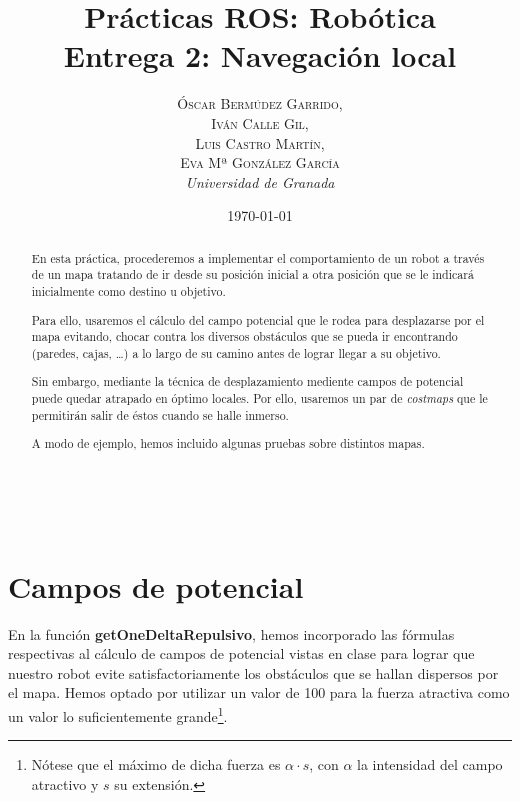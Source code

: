 \documentclass[a4paper, 11pt]{article}
\title{\textbf{Prácticas ROS: Robótica}\\ %
Entrega 2: Navegación local} %
\author{\textsc{Óscar Bermúdez Garrido,\\Iván Calle Gil,\\ Luis Castro Martín,\\ Eva Mª González García} %
\\{\textit{Universidad de Granada}}} %
\date{\today} %
\makeatletter
\renewcommand{\maketitle}{
  \begin{flushright} %
  
  {\LARGE\@title} %
  
  \vspace{50pt} %
  
  {\large\@author} %
  \\\@date %
  \vspace{40pt} %
  \end{flushright}
}
\makeatother
\begin{document}
\maketitle %

\renewcommand{\abstractname}{Resumen} %
\begin{abstract}
	En esta práctica, procederemos a implementar el comportamiento de un robot a través de un mapa
	tratando de ir desde su posición inicial a otra posición que se le indicará inicialmente como
	destino u objetivo.
	
	Para ello, usaremos el cálculo del campo potencial que le rodea para desplazarse por el mapa evitando,
	chocar contra los diversos obstáculos que se pueda ir encontrando (paredes, cajas, \dots) a lo largo
	de su camino antes de lograr llegar a su objetivo.

	Sin embargo, mediante la técnica de desplazamiento mediente campos de potencial puede quedar atrapado
	en óptimo locales. Por ello, usaremos un par de \textit{costmaps} que le permitirán salir de éstos
	cuando se halle inmerso.
	
	A modo de ejemplo, hemos incluido algunas pruebas sobre distintos mapas.
	
	
\end{abstract}


{\parskip=2pt
  \tableofcontents
}
\pagebreak


\section{Campos de potencial}
	En la función \textbf{getOneDeltaRepulsivo}, hemos incorporado las fórmulas respectivas al cálculo
	de campos de potencial vistas en clase para lograr que nuestro robot evite satisfactoriamente los
	obstáculos que se hallan dispersos por el mapa. Hemos optado por utilizar un valor de 100  para
	la fuerza atractiva como un valor lo suficientemente grande\footnote{Nótese que el máximo de dicha
	fuerza es $\alpha \cdot s$, con $\alpha$ la intensidad del campo atractivo y $s$ su extensión.}.
	
\end{document}
